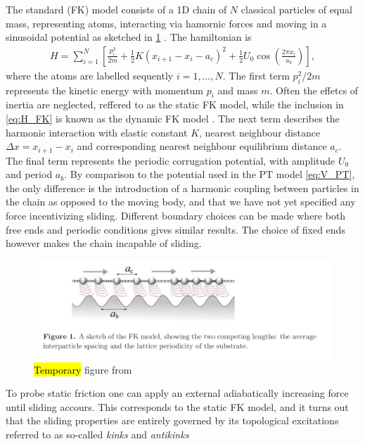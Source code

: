 The standard (\acrshort{FK}) model consists of a 1D chain of $N$ classical particles of equal mass, representing atoms, interacting via hamornic forces and moving in a sinusoidal potential as sketched in \cref{fig:FK_model} \cite{Manini_2016}. The hamiltonian is 
\begin{align}
  H = \sum_{i=1}^N \left[\frac{p_i^2}{2m} + \frac{1}{2}K(x_{i+1} - x_i - a_c)^2 + \frac{1}{2}U_0 \cos{\left(\frac{2\pi x_i}{a_b}\right)}\right],
  \label{eq:H_FK}
\end{align}
where the atoms are labelled sequently $i = 1, \hdots, N$. The first term $p_i^2/2m$ represents the kinetic energy with momentum $p_i$
and mass $m$. Often the effetcs of inertia are neglected, reffered to as the static \acrshort{FK} model, while the inclusion in \cref{eq:H_FK} is known as the dynamic \acrshort{FK} model \cite{FK2D}. The next term describes the harmonic interaction with elastic
constant $K$, nearest neighbour distance $\Delta x = x_{i+1} - x_i$ and 
corresponding nearest neighbour equilibrium distance $a_c$. The final term represents the periodic corrugation potential, with amplitude $U_0$ and period $a_b$. By comparison to the potential used in the \acrshort{PT} model \cref{eq:V_PT}, the only difference is the introduction of a harmonic coupling between particles in the chain as opposed to the moving body, and that we have not yet specified any force incentivizing sliding. Different boundary choices can be made where both free ends and periodic conditions gives similar results. The choice of fixed ends however makes the chain incapable of sliding.

\begin{figure}[H]
  \centering
  \includegraphics[width=0.8\linewidth]{figures/theory/FK_model.png}
  \caption{\hl{Temporary} figure from \cite{Manini_2016}}
  \label{fig:FK_model}
\end{figure}

To probe static friction one can apply an external adiabatically increasing force until sliding accours. This corresponds to the static \acrshort{FK} model, and it turns out that the sliding properties are entirely governed by its topological excitations referred to as so-called \textit{kinks} and \textit{antikinks}

